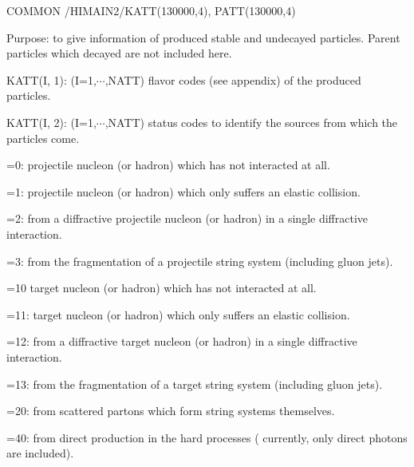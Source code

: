 \begin{description}
\itemsep=-4.0pt
\item{}COMMON /HIMAIN2/KATT(130000,4), PATT(130000,4)
\item{}Purpose: to give information of produced stable and undecayed
                particles. Parent particles which decayed are not included
                here.
\item{}KATT(I, 1): (I=1,$\cdots$,NATT) flavor codes (see appendix) of 
                the produced particles.
\item{}KATT(I, 2): (I=1,$\cdots$,NATT) status codes to identify the 
                sources from which the particles come.
        \vspace{-12.0pt}
        \begin{description}
        \itemsep=-4.0pt
                \item{}=0: projectile nucleon (or hadron) which has 
                        not interacted at all.
                \item{}=1: projectile nucleon (or hadron) which 
                        only suffers an elastic collision.
                \item{}=2: from a diffractive projectile nucleon (or hadron)
                        in a single diffractive interaction.
                \item{}=3: from the fragmentation of a projectile string
                        system (including gluon jets).
                \item{}=10 target nucleon (or hadron) which has not 
                        interacted at all.
                \item{}=11: target nucleon (or hadron) which only 
                        suffers an elastic collision.
                \item{}=12: from a diffractive target nucleon (or hadron)
                        in a single diffractive interaction.
                \item{}=13: from the fragmentation of a target string 
                        system (including gluon jets).
                \item{}=20: from scattered partons which form string
                        systems themselves.
                \item{}=40: from direct production in the hard processes
                        ( currently, only direct photons are included).
        \end{description}
        \vspace{-4.0pt}

\end{description}
